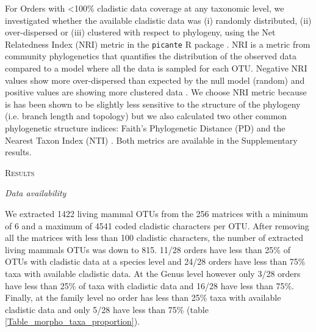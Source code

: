 \documentclass[12pt,letterpaper]{article}
\renewcommand{\section}[1]{%
\bigskip
\begin{center}
\begin{Large}
\normalfont\scshape #1
\medskip
\end{Large}
\end{center}}
\renewcommand{\subsection}[1]{%
\bigskip
\begin{center}
\begin{large}
\normalfont\itshape #1
\end{large}
\end{center}}
\begin{document}
For Orders with \textless 100\% cladistic data coverage at any taxonomic level, we investigated whether the available cladistic data was (i) randomly distributed, (ii) over-dispersed or (iii) clustered with respect to phylogeny, using the Net Relatedness Index (NRI) metric \citep{webb2002phylogenies} in the \texttt{picante} R package \citep{picante}. %
NRI is a metric from community phylogenetics that quantifies the distribution of the observed data compared to a model where all the data is sampled for each OTU. 
Negative NRI values show more over-dispersed than expected by the null model (random) and positive values are showing more clustered data \citep{webb2002phylogenies}.
We choose NRI metric because is has been shown to be slightly less sensitive to the structure of the phylogeny (i.e. branch length and topology) \citep{NRI,journal.pone.0004390} but we also calculated two other common phylogenetic structure indices: Faith's Phylogenetic Distance (PD) \citep{Faith19921} and the Nearest Taxon Index (NTI) \citep{webb2002phylogenies}.
Both metrics are available in the Supplementary results.

%
%

\section{Results}

\subsection{Data availability}
We extracted 1422 living mammal OTUs from the 256 matrices with a minimum of 6 and a maximum of 4541 coded cladistic characters per OTU.
After removing all the matrices with less than 100 cladistic characters, the number of extracted living mammals OTUs was down to 815.
11/28 orders have less than 25\% of OTUs with cladistic data at a species level and 24/28 orders have less than 75\% taxa with available cladistic data.
At the Genus level however only 3/28 orders have less than 25\% of taxa with cladistic data and 16/28 have less than 75\%.
Finally, at the family level no order has less than 25\% taxa with available cladistic data and only 5/28 have less than 75\% (table \ref{Table_morpho_taxa_proportion}).
\end{document}
